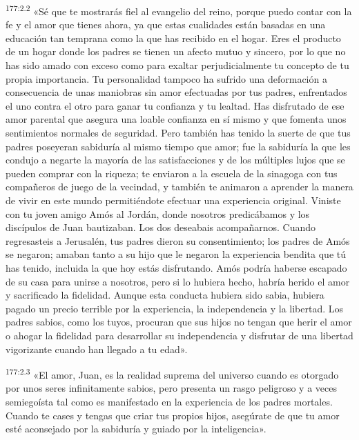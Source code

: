 \par 
\textsuperscript{177:2.2} «Sé que te mostrarás fiel al evangelio del reino, porque puedo contar con la fe y el amor que tienes ahora, ya que estas cualidades están basadas en una educación tan temprana como la que has recibido en el hogar. Eres el producto de un hogar donde los padres se tienen un afecto mutuo y sincero, por lo que no has sido amado con exceso como para exaltar perjudicialmente tu concepto de tu propia importancia. Tu personalidad tampoco ha sufrido una deformación a consecuencia de unas maniobras sin amor efectuadas por tus padres, enfrentados el uno contra el otro para ganar tu confianza y tu lealtad. Has disfrutado de ese amor parental que asegura una loable confianza en sí mismo y que fomenta unos sentimientos normales de seguridad. Pero también has tenido la suerte de que tus padres poseyeran sabiduría al mismo tiempo que amor; fue la sabiduría la que les condujo a negarte la mayoría de las satisfacciones y de los múltiples lujos que se pueden comprar con la riqueza; te enviaron a la escuela de la sinagoga con tus compañeros de juego de la vecindad, y también te animaron a aprender la manera de vivir en este mundo permitiéndote efectuar una experiencia original. Viniste con tu joven amigo Amós al Jordán, donde nosotros predicábamos y los discípulos de Juan bautizaban. Los dos deseabais acompañarnos. Cuando regresasteis a Jerusalén, tus padres dieron su consentimiento; los padres de Amós se negaron; amaban tanto a su hijo que le negaron la experiencia bendita que tú has tenido, incluida la que hoy estás disfrutando. Amós podría haberse escapado de su casa para unirse a nosotros, pero si lo hubiera hecho, habría herido el amor y sacrificado la fidelidad. Aunque esta conducta hubiera sido sabia, hubiera pagado un precio terrible por la experiencia, la independencia y la libertad. Los padres sabios, como los tuyos, procuran que sus hijos no tengan que herir el amor o ahogar la fidelidad para desarrollar su independencia y disfrutar de una libertad vigorizante cuando han llegado a tu edad».

\par 
\textsuperscript{177:2.3} «El amor, Juan, es la realidad suprema del universo cuando es otorgado por unos seres infinitamente sabios, pero presenta un rasgo peligroso y a veces semiegoísta tal como es manifestado en la experiencia de los padres mortales. Cuando te cases y tengas que criar tus propios hijos, asegúrate de que tu amor esté aconsejado por la sabiduría y guiado por la inteligencia».

